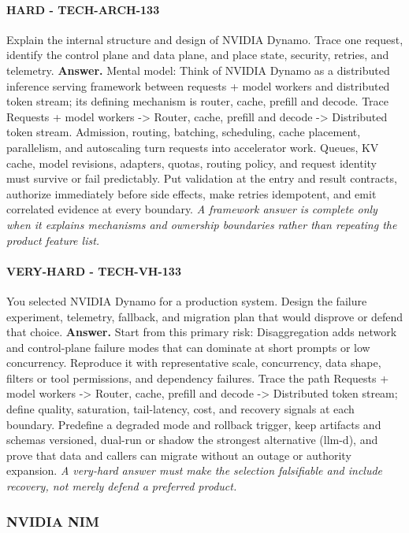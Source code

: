 \paragraph{HARD - TECH-ARCH-133} Explain the internal structure and design of NVIDIA Dynamo. Trace one request, identify the control plane and data plane, and place state, security, retries, and telemetry.
\textbf{Answer.} Mental model: Think of NVIDIA Dynamo as a distributed inference serving framework between requests + model workers and distributed token stream; its defining mechanism is router, cache, prefill and decode. Trace Requests + model workers -> Router, cache, prefill and decode -> Distributed token stream. Admission, routing, batching, scheduling, cache placement, parallelism, and autoscaling turn requests into accelerator work. Queues, KV cache, model revisions, adapters, quotas, routing policy, and request identity must survive or fail predictably. Put validation at the entry and result contracts, authorize immediately before side effects, make retries idempotent, and emit correlated evidence at every boundary.
\textit{A framework answer is complete only when it explains mechanisms and ownership boundaries rather than repeating the product feature list.}
\paragraph{VERY-HARD - TECH-VH-133} You selected NVIDIA Dynamo for a production system. Design the failure experiment, telemetry, fallback, and migration plan that would disprove or defend that choice.
\textbf{Answer.} Start from this primary risk: Disaggregation adds network and control-plane failure modes that can dominate at short prompts or low concurrency. Reproduce it with representative scale, concurrency, data shape, filters or tool permissions, and dependency failures. Trace the path Requests + model workers -> Router, cache, prefill and decode -> Distributed token stream; define quality, saturation, tail-latency, cost, and recovery signals at each boundary. Predefine a degraded mode and rollback trigger, keep artifacts and schemas versioned, dual-run or shadow the strongest alternative (llm-d), and prove that data and callers can migrate without an outage or authority expansion.
\textit{A very-hard answer must make the selection falsifiable and include recovery, not merely defend a preferred product.}
\subsubsection*{NVIDIA NIM}
